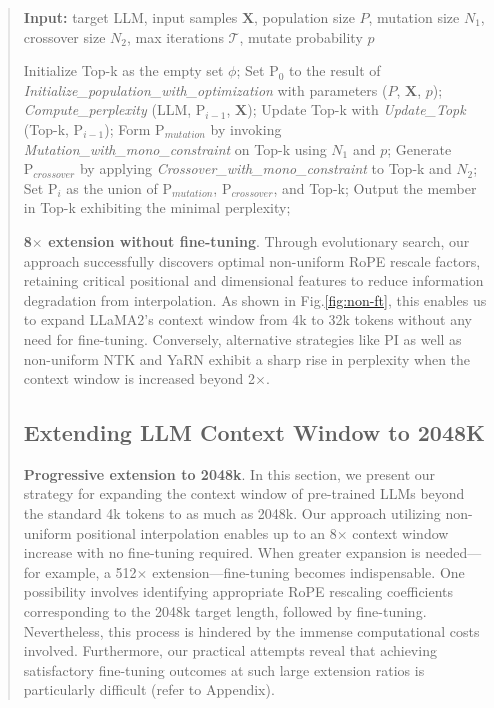 \begin{abstract}
\begin{algorithm}[t]
	\small
	\caption{The search algorithm}
	\textbf{Input:} target LLM, input samples $\mathbf{X}$,   population size $P$, mutation size $N_1$, crossover size $N_2$, max iterations $\mathcal{T}$, mutate probability $p$\\

	\begin{algorithmic}[1]
		\label{alg:search}
		\STATE Initialize Top-k as the empty set $\phi$;
		\STATE Set $\text{P}_0$ to the result of \textit{Initialize\_population\_with\_optimization} with parameters ($P$, $\mathbf{X}$, $p$);
		\STATE \textit{Compute\_perplexity} (LLM, $\text{P}_{i-1}$, $\mathbf{X}$);
		\STATE  Update Top-k with \textit{Update\_Topk} (Top-k, $\text{P}_{i-1}$);
		\STATE Form $\text{P}_{mutation}$ by invoking \textit{Mutation\_with\_mono\_constraint} on Top-k using $N_1$ and $p$;
		\STATE Generate $\text{P}_{crossover}$ by applying \textit{Crossover\_with\_mono\_constraint} to Top-k and $N_2$;
		\STATE Set $\text{P}_i$ as the union of $\text{P}_{mutation}$, $\text{P}_{crossover}$, and Top-k;
		\ENDFOR
		\STATE Output the member in Top-k exhibiting the minimal perplexity;
	\end{algorithmic}
\end{algorithm}

\textbf{8$\times$ extension without fine-tuning}. Through evolutionary search, our approach successfully discovers optimal non-uniform RoPE rescale factors, retaining critical positional and dimensional features to reduce information degradation from interpolation. As shown in Fig.\ref{fig:non-ft}, this enables us to expand LLaMA2’s context window from 4k to 32k tokens without any need for fine-tuning. Conversely, alternative strategies like PI as well as non-uniform NTK and YaRN exhibit a sharp rise in perplexity when the context window is increased beyond 2$\times$.

\subsection{Extending LLM Context Window to 2048K}
\label{sec:extendto2048k}

\textbf{Progressive extension to 2048k}. In this section, we present our strategy for expanding the context window of pre-trained LLMs beyond the standard 4k tokens to as much as 2048k. Our approach utilizing non-uniform positional interpolation enables up to an 8$\times$ context window increase with no fine-tuning required. When greater expansion is needed—for example, a 512$\times$ extension—fine-tuning becomes indispensable. One possibility involves identifying appropriate RoPE rescaling coefficients corresponding to the 2048k target length, followed by fine-tuning. Nevertheless, this process is hindered by the immense computational costs involved. Furthermore, our practical attempts reveal that achieving satisfactory fine-tuning outcomes at such large extension ratios is particularly difficult (refer to Appendix).


\end{abstract}
